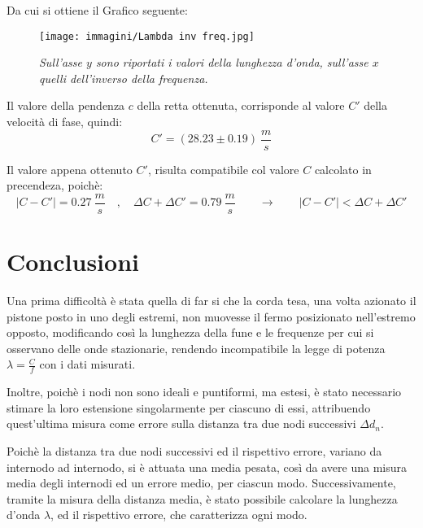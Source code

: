 \documentclass[12pt, a4paper]{article}
\begin{document}
Da cui si ottiene il Grafico seguente:
\begin{figure}[!htb]
\centering
\texttt{[image: immagini/Lambda inv freq.jpg]}
    \centering
    \caption{\textit{Sull'asse $y$ sono riportati i valori della lunghezza d'onda, sull'asse $x$ quelli dell'inverso della frequenza.}}
    \label{im: rel lin lam inv freq}
\end{figure}

\bigskip

Il valore della pendenza $c$ della retta ottenuta, corrisponde al valore $C'$ della velocità di fase, quindi:
\begin{equation*}
    C'=(28.23\pm0.19)\ \frac{m}{s}
\end{equation*}

Il valore appena ottenuto $C'$, risulta compatibile col valore $C$ calcolato in precendeza, poichè:
\begin{equation*}
|C-C'|=0.27\ \frac{m}{s}\quad ,\quad \Delta C + \Delta C'=0.79\ \frac{m}{s}\quad\quad \xrightarrow{}\quad\quad  |C-C'|<\Delta C + \Delta C'
\end{equation*}

 
\section{Conclusioni}
Una prima difficoltà è stata quella di far si che la corda tesa, una volta azionato il pistone posto in uno degli estremi, non muovesse il fermo posizionato nell'estremo opposto, modificando così la lunghezza della fune e le frequenze per cui si osservano delle onde stazionarie, rendendo incompatibile la legge di potenza $\lambda=\frac{C}{f}$ con i dati misurati. 

Inoltre, poichè i nodi non sono ideali e puntiformi, ma estesi, è stato necessario stimare la loro estensione singolarmente per ciascuno di essi, attribuendo quest'ultima misura come errore sulla distanza tra due nodi successivi $\Delta d_n$.

\bigskip

Poichè la distanza tra due nodi successivi ed il rispettivo errore, variano da internodo ad internodo, si è attuata una media pesata, così da avere una misura media degli internodi ed un errore medio, per ciascun modo. Successivamente, tramite la misura della distanza media, è stato possibile calcolare la lunghezza d'onda $\lambda$, ed il rispettivo errore, che caratterizza ogni modo.

\bigskip
\end{document}
